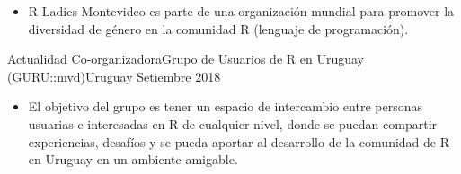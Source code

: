 \begin{experiences}
{\begin{itemize}
                     \item R-Ladies Montevideo es parte de una organización mundial para promover la diversidad de género en la comunidad R (lenguaje de programación).


                      \end{itemize}
                    }
                    {}
\emptySeparator
  \experience
    {Actualidad} {Co-organizadora}{Grupo de Usuarios de R en  Uruguay (GURU::mvd)}{Uruguay}
    {Setiembre 2018}    {
                      \begin{itemize}
                        
                     \item El objetivo del grupo es tener un espacio de intercambio entre personas usuarias e interesadas en R de cualquier nivel, donde se puedan compartir experiencias, desafíos y se pueda aportar al desarrollo de la comunidad de R en Uruguay en un ambiente amigable.


                      \end{itemize}
                    }
                    {}

    
\end{experiences}
